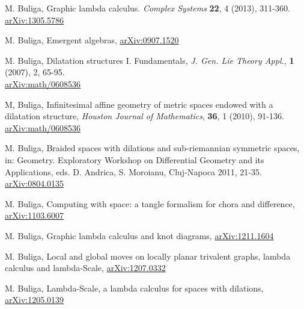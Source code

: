 \documentclass{article}
\begin{document}
 
\begin{thebibliography}{99}


 M. Buliga, Graphic lambda calculus. {\it Complex Systems} {\bf 22}, 4 (2013), 311-360. \\ 
\href{https://arxiv.org/abs/1305.5786}{arXiv:1305.5786}

 M. Buliga, Emergent algebras, \href{https://arxiv.org/abs/0907.1520}{arXiv:0907.1520}

 M. Buliga, Dilatation structures I. Fundamentals, {\it 
J. Gen. Lie Theory Appl.},  {\bf 1} (2007),  2, 65-95. \\ 
\href{https://arxiv.org/abs/math/0608536}{arXiv:math/0608536}


 M, Buliga, Infinitesimal affine geometry of metric spaces endowed with a dilatation structure, {\it Houston Journal of Mathematics}, {\bf 36}, 1 (2010), 91-136. \\ 
\href{https://arxiv.org/abs/0804.0135}{arXiv:math/0608536}


 M. Buliga, Braided spaces with dilations and sub-riemannian symmetric spaces, in: Geometry. Exploratory Workshop on Differential Geometry and its Applications, eds. D. Andrica, S. Moroianu, Cluj-Napoca 2011, 21-35. \\   
\href{https://arxiv.org/abs/1005.5031}{arXiv:0804.0135}


 M. Buliga, Computing with space: a tangle formalism for chora and difference, \href{https://arxiv.org/abs/1103.6007}{arXiv:1103.6007}






 M. Buliga, Graphic lambda calculus and knot diagrams, \href{http://arxiv.org/abs/1211.1604}{arXiv:1211.1604}


 M. Buliga, Local and global moves on locally planar trivalent graphs, lambda calculus and lambda-Scale, \href{http://arxiv.org/abs/1207.0332}{arXiv:1207.0332} 

 M. Buliga, Lambda-Scale, a lambda calculus for spaces with dilations,  \href{http://arxiv.org/abs/1205.0139}{arXiv:1205.0139}
\end{thebibliography}
\end{document}
